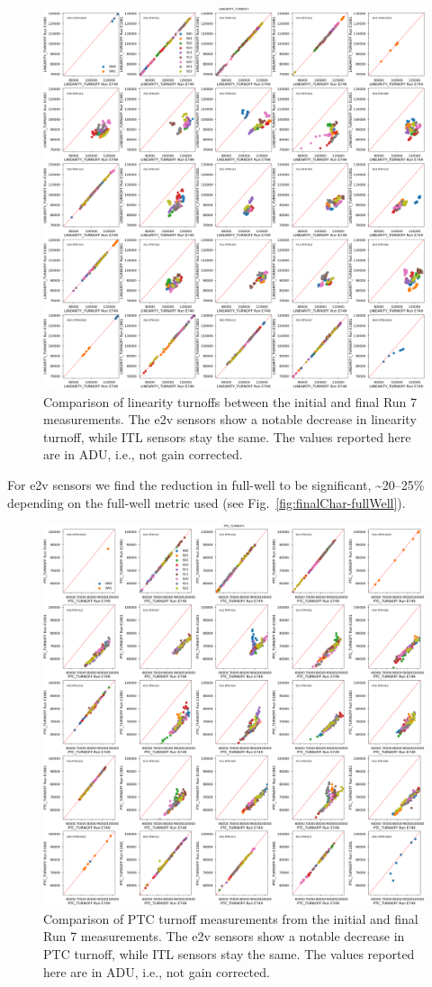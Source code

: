 \begin{figure}[ht]
    \centering
    \includegraphics[width=0.7\linewidth]{figures/finalCharacterization/E749_E1881_LINEARITY_TURNOFF.png}
    \caption{Comparison of linearity turnoffs between the initial and final Run 7 measurements. The e2v sensors show a notable decrease in linearity turnoff, while ITL sensors stay the same. The values reported here are in ADU, i.e., not gain corrected.}
    \label{fig:finalChar-Linearity-5x5}
\end{figure}

For e2v sensors we find the reduction in full-well to be significant, \textasciitilde20--25\% depending on the full-well metric used (see Fig.~\ref{fig:finalChar-fullWell}).

\begin{figure}[ht]
    \centering
    \includegraphics[width=0.7\linewidth]{figures/finalCharacterization/E749_E1881_PTC_TURNOFF.png}
    \caption{Comparison of PTC turnoff measurements from the initial and final Run 7 measurements. The e2v sensors show a notable decrease in PTC turnoff, while ITL sensors stay the same. The values reported here are in ADU, i.e., not gain corrected.}
    \label{fig:finalChar-PTCTurnoff-5x5}
\end{figure}


